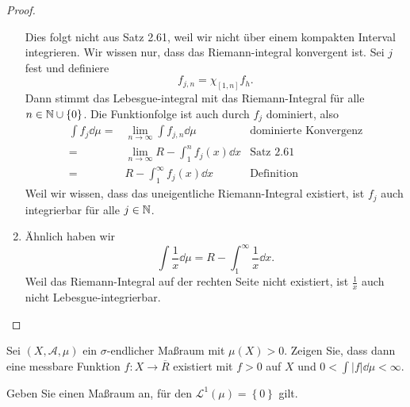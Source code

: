 \begin{proof}
\begin{parts}
\begin{enumerate}[label=(\roman*)]
			Dies folgt nicht aus Satz 2.61, weil wir nicht über einem kompakten Interval integrieren. Wir wissen nur, dass das Riemann-integral konvergent ist. Sei $j$ fest und definiere
			\[
				f_{j,n}=\chi_{[1,n]}f_h
			.\] 
			Dann stimmt das Lebesgue-integral mit das Riemann-Integral f\"{u}r alle $n\in \mathbb{N}\cup \left\{ 0 \right\} $. Die Funktionfolge ist auch durch $f_j$ dominiert, also
		\begin{align*}
			\int f_j \dd{\mu}=& \lim_{n \to \infty} \int f_{j,n}\dd{\mu} & \text{dominierte Konvergenz}\\
			=&\lim_{n \to \infty} R-\int_1^n f_j(x)\dd{x} & \text{Satz 2.61}\\
			=&R-\int_1^\infty f_j(x)\dd{x} & \text{Definition}
		\end{align*} 
		Weil wir wissen, dass das uneigentliche Riemann-Integral existiert, ist $f_j$ auch integrierbar f\"{u}r alle $j\in \mathbb{N}$.
		\item Ähnlich haben wir
			\[
				\int \frac{1}{x}\dd{\mu}=R-\int_1^\infty \frac{1}{x}\dd{x}
			.\] 
			Weil das Riemann-Integral auf der rechten Seite nicht existiert, ist $\frac{1}{x}$ auch nicht Lebesgue-integrierbar.\qedhere
	\end{enumerate}
	\end{parts}
\end{proof}
\begin{Problem}
	\begin{parts}
	\item Sei $(X,\mathcal{A},\mu)$ ein $\sigma$-endlicher Maßraum mit $\mu(X)>0$. Zeigen Sie, dass dann eine messbare Funktion $f:X\to \overline{R}$ existiert mit $f>0$ auf $X$ und $0<\int |f|\dd{\mu}<\infty$.
\item Geben Sie einen Maßraum an, f\"{u}r den $\mathcal{L}^1(\mu)=\left\{ 0 \right\} $ gilt.
	\end{parts}
\end{Problem}
